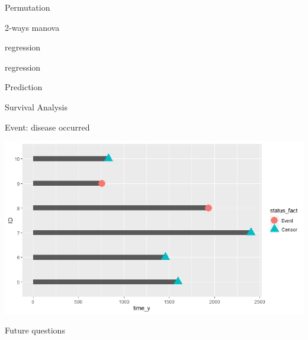 \documentclass{beamer}
\begin{document}
\begin{frame}{Permutation}

\end{frame}

\begin{frame}{2-ways manova}

\end{frame}

\begin{frame}{regression}





\end{frame}

\begin{frame}{regression}



\end{frame}

\begin{frame}{Prediction}

\end{frame}

\begin{frame}{Survival Analysis}

\vspace{0.3 cm}
Event: disease occurred

	\begin{center}
		\includegraphics[width=0.9\columnwidth]{survival_plot2.jpeg}
	\end{center}
\end{frame}

\begin{frame}{Future questions}

\end{frame}
\end{document}
